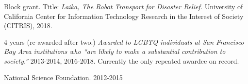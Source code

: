 \documentclass[letterpaper]{deedy-resume} %
\begin{document}
{\begin{etaremune}
\item {{} Block grant. Title: {\it Laika, The Robot Transport for Disaster Relief.} University of California Center for Information Technology Research in the Interest of Society (CITRIS), 2018.}

\item {{} 4 years (re-awarded after two.) {\it Awarded to LGBTQ individuals at San Francisco Bay Area institutions who ``are likely to make a substantial contribution to society.''} 2013-2014, 2016-2018. Currently the only repeated awardee on record.}

\item {{} National Science Foundation. 2012-2015}

\end{etaremune}


\vspace{-0.2cm}



%
%
%
%


}
\end{document}
